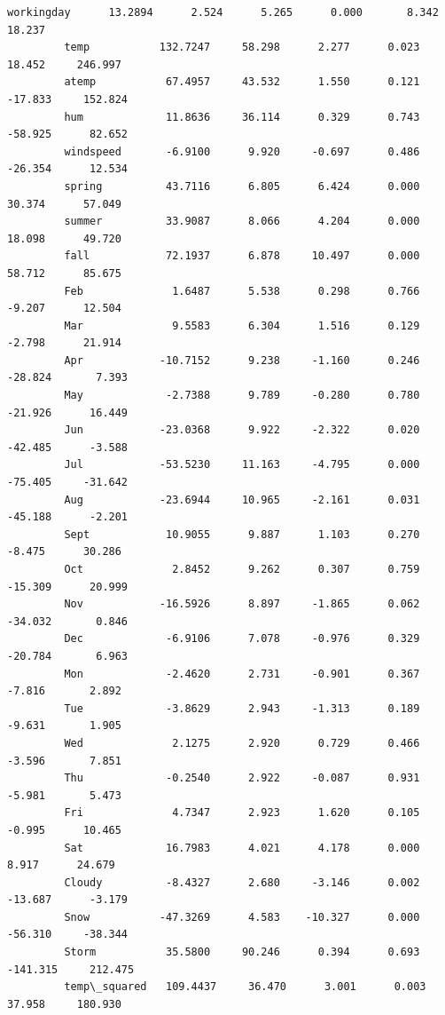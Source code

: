 \documentclass[11pt]{article}
\begin{document}
\begin{Verbatim}[commandchars=\\\{\}]
         workingday      13.2894      2.524      5.265      0.000       8.342      18.237
         temp           132.7247     58.298      2.277      0.023      18.452     246.997
         atemp           67.4957     43.532      1.550      0.121     -17.833     152.824
         hum             11.8636     36.114      0.329      0.743     -58.925      82.652
         windspeed       -6.9100      9.920     -0.697      0.486     -26.354      12.534
         spring          43.7116      6.805      6.424      0.000      30.374      57.049
         summer          33.9087      8.066      4.204      0.000      18.098      49.720
         fall            72.1937      6.878     10.497      0.000      58.712      85.675
         Feb              1.6487      5.538      0.298      0.766      -9.207      12.504
         Mar              9.5583      6.304      1.516      0.129      -2.798      21.914
         Apr            -10.7152      9.238     -1.160      0.246     -28.824       7.393
         May             -2.7388      9.789     -0.280      0.780     -21.926      16.449
         Jun            -23.0368      9.922     -2.322      0.020     -42.485      -3.588
         Jul            -53.5230     11.163     -4.795      0.000     -75.405     -31.642
         Aug            -23.6944     10.965     -2.161      0.031     -45.188      -2.201
         Sept            10.9055      9.887      1.103      0.270      -8.475      30.286
         Oct              2.8452      9.262      0.307      0.759     -15.309      20.999
         Nov            -16.5926      8.897     -1.865      0.062     -34.032       0.846
         Dec             -6.9106      7.078     -0.976      0.329     -20.784       6.963
         Mon             -2.4620      2.731     -0.901      0.367      -7.816       2.892
         Tue             -3.8629      2.943     -1.313      0.189      -9.631       1.905
         Wed              2.1275      2.920      0.729      0.466      -3.596       7.851
         Thu             -0.2540      2.922     -0.087      0.931      -5.981       5.473
         Fri              4.7347      2.923      1.620      0.105      -0.995      10.465
         Sat             16.7983      4.021      4.178      0.000       8.917      24.679
         Cloudy          -8.4327      2.680     -3.146      0.002     -13.687      -3.179
         Snow           -47.3269      4.583    -10.327      0.000     -56.310     -38.344
         Storm           35.5800     90.246      0.394      0.693    -141.315     212.475
         temp\_squared   109.4437     36.470      3.001      0.003      37.958     180.930

\end{Verbatim}
\end{document}
